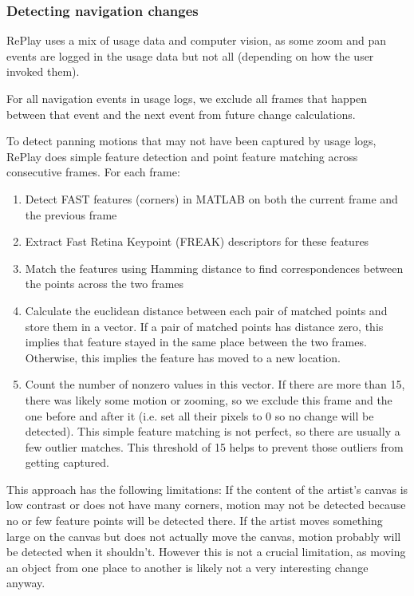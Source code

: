 \subsubsection{Detecting navigation changes}
RePlay uses a mix of usage data and computer vision, as some zoom and pan events are logged in the usage data but not all (depending on how the user invoked them).

For all navigation events in usage logs, we exclude all frames that happen between that event and the next event from future change calculations.

To detect panning motions that may not have been captured by usage logs, RePlay does simple feature detection and point feature matching across consecutive frames. For each frame:
\begin{enumerate}
\item Detect FAST features (corners) in MATLAB on both the current frame and the previous frame
\item Extract Fast Retina Keypoint (FREAK) descriptors for these features
\item Match the features using Hamming distance to find correspondences between the points across the two frames
\item Calculate the euclidean distance between each pair of matched points and store them in a vector. If a pair of matched points has distance zero, this implies that feature stayed in the same place between the two frames. Otherwise, this implies the feature has moved to a new location.
\item Count the number of nonzero values in this vector. If there are more than 15, there was likely some motion or zooming, so we exclude this frame and the one before and after it (i.e. set all their pixels to 0 so no change will be detected). This simple feature matching is not perfect, so there are usually a few outlier matches. This threshold of 15 helps to prevent those outliers from getting captured.
\end{enumerate}

This approach has the following limitations: If the content of the artist's canvas is low contrast or does not have many corners, motion may not be detected because no or few feature points will be detected there. If the artist moves something large on the canvas but does not actually move the canvas, motion probably will be detected when it shouldn't. However this is not a crucial limitation, as moving an object from one place to another is likely not a very interesting change anyway.


